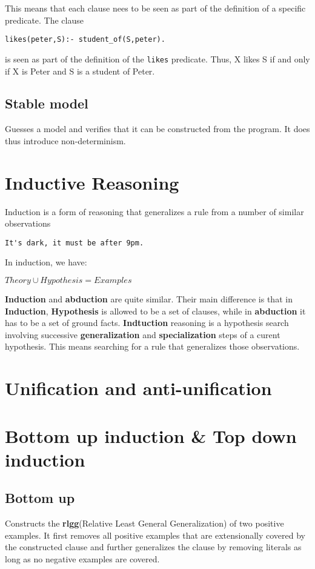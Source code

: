 \documentclass[12pt, oneside]{report}
\numberwithin{definition}{chapter}
\numberwithin{theorem}{chapter}
\numberwithin{lemma}{chapter}
\numberwithin{Rule}{chapter}
\numberwithin{equation}{chapter}
\begin{document}
This means that each clause nees to be seen as part of the definition of a specific predicate. The clause 

\begin{verbatim}
likes(peter,S):- student_of(S,peter).
\end{verbatim}
is seen as part of the definition of the \texttt{likes} predicate. Thus, X likes S if and only if X is Peter and S is a student of Peter. 
\subsection{Stable model}
Guesses a model and verifies that it can be constructed from the program. It does thus introduce non-determinism. 


\section{Inductive Reasoning}
Induction is a form of reasoning that generalizes a rule from a number of similar observations
\begin{verbatim}
It's dark, it must be after 9pm.
\end{verbatim}
In induction, we have:
\begin{tcolorbox}
$
Theory \cup Hypothesis = Examples
$
\end{tcolorbox}
\textbf{Induction} and \textbf{abduction} are quite similar. Their main difference is that in \textbf{Induction}, \textbf{Hypothesis} is allowed to be a set of clauses, while in \textbf{abduction} it has to be a set of ground facts. \textbf{Indtuction} reasoning is a hypothesis search involving successive \textbf{generalization} and \textbf{specialization} steps of a curent hypothesis. This means searching for a rule that generalizes those observations.
\section{Unification and anti-unification}

\section{Bottom up induction \& Top down induction}
\subsection{Bottom up}
Constructs the \textbf{rlgg}(Relative Least General Generalization) of two positive examples.
It first removes all positive examples that are extensionally covered by the constructed clause and further generalizes the clause by removing literals as long as no negative examples are covered.
\end{document}
